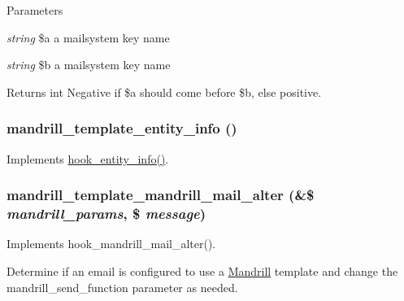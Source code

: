 \begin{DoxyParams}{Parameters}
\item[{\em string}]\$a a mailsystem key name \item[{\em string}]\$b a mailsystem key name\end{DoxyParams}
\begin{DoxyReturn}{Returns}
int Negative if \$a should come before \$b, else positive. 
\end{DoxyReturn}
\hypertarget{mandrill__template_8module_a388c001a4f19bb5e890e5962d9a9481a}{
\subsubsection[{mandrill\_\-template\_\-entity\_\-info}]{\setlength{\rightskip}{0pt plus 5cm}mandrill\_\-template\_\-entity\_\-info ()}}
\label{mandrill__template_8module_a388c001a4f19bb5e890e5962d9a9481a}
Implements \hyperlink{group__hooks_gaf02318e9d0e8cdbf6d187b271b9969a8}{hook\_\-entity\_\-info()}. \hypertarget{mandrill__template_8module_ab93754dd057f76eac9f42382cd35815e}{
\subsubsection[{mandrill\_\-template\_\-mandrill\_\-mail\_\-alter}]{\setlength{\rightskip}{0pt plus 5cm}mandrill\_\-template\_\-mandrill\_\-mail\_\-alter (\&\$ {\em mandrill\_\-params}, \/  \$ {\em message})}}
\label{mandrill__template_8module_ab93754dd057f76eac9f42382cd35815e}
Implements hook\_\-mandrill\_\-mail\_\-alter().

Determine if an email is configured to use a \hyperlink{classMandrill}{Mandrill} template and change the mandrill\_\-send\_\-function parameter as needed.


